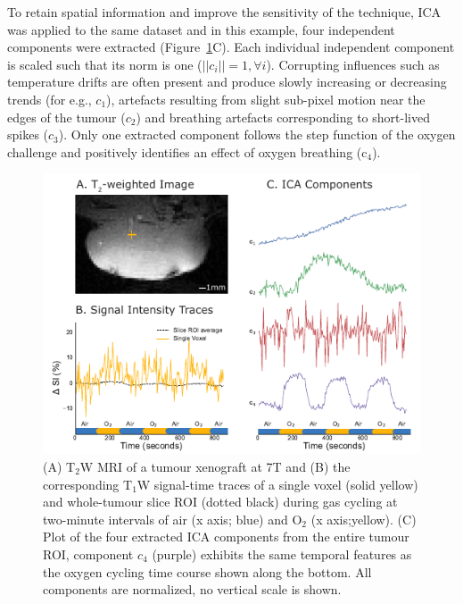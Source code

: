 To retain spatial information and improve the sensitivity of the technique, \acs{ICA} was applied to the same dataset and in this example, four independent components were extracted (Figure~\ref{technique}C). 
Each individual independent component is scaled such that its norm is one ($||c_i||=1, \forall i $).
Corrupting influences such as temperature drifts are often present and produce slowly increasing or decreasing trends (for e.g., $c_1$), artefacts resulting from slight sub-pixel motion near the edges of the tumour ($c_2$) and breathing artefacts corresponding to short-lived spikes ($c_3$).
Only one extracted component follows the step function of the oxygen challenge and positively identifies an effect of oxygen breathing (c$_4$).
\begin{figure}[htbp]
   \includegraphics[width=\textwidth]{oemri_thesis1/oemri_thesis1-images/fig1_technique.pdf} %
   \caption{(A) T$_2$W MRI of a tumour xenograft at 7T and (B) the corresponding T$_1$W signal-time traces of a single voxel (solid yellow) and whole-tumour slice ROI (dotted black) during gas cycling at two-minute intervals of air (x axis; blue) and O$_2$ (x axis;yellow).
(C) Plot of the four extracted \acs{ICA} components from the entire tumour ROI, component \textbf{$c_4$} (purple) exhibits the same temporal features as the oxygen cycling time course shown along the bottom. All components are normalized, no vertical scale is shown.}
   \label{technique}
\end{figure}

